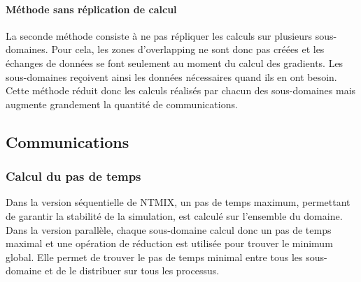 \paragraph{Méthode sans réplication de calcul}
La seconde méthode consiste à ne pas répliquer les calculs sur plusieurs sous-domaines. Pour cela, les zones d'overlapping ne sont donc pas créées et les échanges de données se font seulement au moment du calcul des gradients. Les sous-domaines reçoivent ainsi les données nécessaires quand ils en ont besoin. Cette méthode réduit donc les calculs réalisés par chacun des sous-domaines mais augmente grandement la quantité de communications.



\subsection{Communications}

\subsubsection{Calcul du pas de temps}
Dans la version séquentielle de NTMIX, un pas de temps maximum, permettant de garantir la stabilité de la simulation, est calculé sur l'ensemble du domaine.
Dans la version parallèle, chaque sous-domaine calcul donc un pas de temps maximal et une opération de réduction est utilisée pour trouver le minimum global. Elle permet de trouver le pas de temps minimal entre tous les sous-domaine et de le distribuer sur tous les processus.


